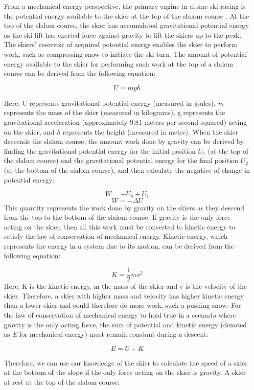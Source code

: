 \documentclass[letterpaper,10pt]{article}
\begin{document}
From a mechanical energy perspective, the primary engine in alpine ski racing is the potential energy available to the skier at the top of the slalom course \cite{supej_differential_2008}. At the top of the slalom course, the skier has accumulated gravitational potential energy as the ski lift has exerted force against gravity to lift the skiers up to the peak. The skiers' reservoir of acquired potential energy enables the skier to perform work, such as compressing snow to initiate the ski turn. The amount of potential energy available to the skier for performing such work at the top of a slalom course can be derived from the following equation:

\[U=mgh\]


Here, U represents gravitational potential energy (measured in joules), \textit{m} represents the mass of the skier (measured in kilograms), g represents the gravitational acceleration (approximately 9.81 meters per second squared) acting on the skier, and \textit{h} represents the height (measured in metre). When the skier descends the slalom course, the amount work done by gravity can be derived by finding the gravitational potential energy for the initial position $U_1$ (at the top of the slalom course) and the gravitational potential energy for the final position $U_2$ (at the bottom of the slalom course), and then calculate the negative of change in potential energy:

\[W=-U_2 + U_1\]
\[W= -\Delta U \]
This quantity represents the work done by gravity on the skiers as they descend from the top to the bottom of the slalom course. If gravity is the only force acting on the skier, then all this work must be converted to kinetic energy to satisfy the law of conservation of mechanical energy. Kinetic energy, which represents the energy in a system due to its motion, can be derived from the following equation:

\[ K = \frac{1}{2} m v^2 \]
Here, K is the kinetic energy, m the mass of the skier and v is the velocity of the skier. Therefore, a skier with higher mass and velocity has higher kinetic energy than a lower skier and could therefore do more work, such a pushing snow. For the law of conservation of mechanical energy to hold true in a scenario where gravity is the only acting force, the sum of potential and kinetic energy (denoted as \textit{E} for mechanical energy) must remain constant during a descent: 

\[ E = U + K \]

Therefore, we can use our knowledge of the skier to calculate the speed of a skier at the bottom of the slope if the only force acting on the skier is gravity. A skier at rest at the top of the slalom course:
\end{document}
